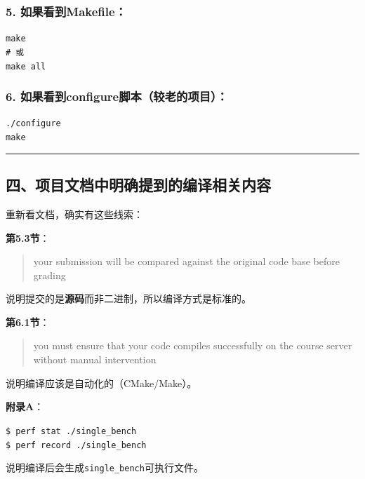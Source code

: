 \documentclass[11pt, a4paper]{article}
\begin{document}
\begin{aibox}
\subsubsection*{5. 如果看到Makefile：}
\begin{tcolorbox}[colback=white,colframe=gray!50!white,boxrule=0.5pt,arc=2pt,left=5pt,right=5pt,top=5pt,bottom=5pt]
\texttt{make}\\
\texttt{\# 或}\\
\texttt{make all}
\end{tcolorbox}

\subsubsection*{6. 如果看到configure脚本（较老的项目）：}
\begin{tcolorbox}[colback=white,colframe=gray!50!white,boxrule=0.5pt,arc=2pt,left=5pt,right=5pt,top=5pt,bottom=5pt]
\texttt{./configure}\\
\texttt{make}
\end{tcolorbox}

\begin{center}\rule{\textwidth}{0.4pt}\end{center}

\subsection*{四、项目文档中明确提到的编译相关内容}

重新看文档，确实有这些线索：

\textbf{第5.3节}：
\begin{quote}
your submission will be compared against the original code base before grading
\end{quote}
说明提交的是\textbf{源码}而非二进制，所以编译方式是标准的。

\textbf{第6.1节}：
\begin{quote}
you must ensure that your code compiles successfully on the course server without manual intervention
\end{quote}
说明编译应该是自动化的（CMake/Make）。

\textbf{附录A}：
\begin{tcolorbox}[colback=white,colframe=gray!50!white,boxrule=0.5pt,arc=2pt,left=5pt,right=5pt,top=5pt,bottom=5pt]
\texttt{\$ perf stat ./single\_bench}\\
\texttt{\$ perf record ./single\_bench}
\end{tcolorbox}
说明编译后会生成\texttt{single\_bench}可执行文件。


\end{aibox}
\end{document}
